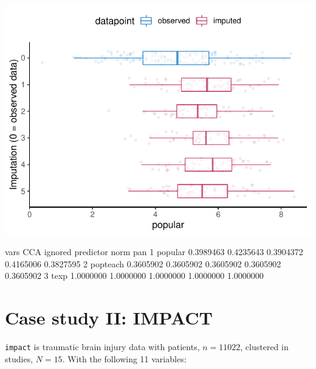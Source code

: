 \documentclass[
]{jss}
\begin{document}
\begin{CodeChunk}


\begin{center}\includegraphics{Manuscript_files/figure-latex/pop_pan_eval-1} \end{center}

\begin{CodeOutput}
      vars       CCA   ignored predictor      norm       pan
1  popular 0.3989463 0.4235643 0.3904372 0.4165006 0.3827595
2 popteach 0.3605902 0.3605902 0.3605902 0.3605902 0.3605902
3     texp 1.0000000 1.0000000 1.0000000 1.0000000 1.0000000
\end{CodeOutput}
\end{CodeChunk}

\hypertarget{case-study-ii-impact}{%
\section{Case study II: IMPACT}\label{case-study-ii-impact}}

\texttt{impact} is traumatic brain injury data with patients,
\(n = 11022\), clustered in studies, \(N = 15\). With the following 11
variables:
\end{document}
